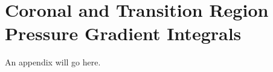 \chapter{Coronal and Transition Region Pressure Gradient Integrals}
\label{ch:appendix}
% 
An appendix will go here.